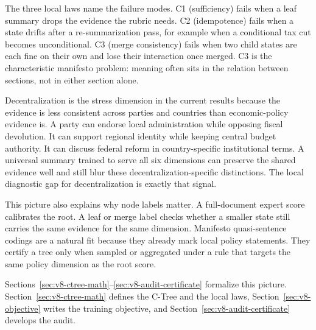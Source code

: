 The three local laws name the failure modes. C1 (sufficiency) fails
when a leaf summary drops the evidence the rubric needs. C2
(idempotence) fails when a state drifts after a re-summarization
pass, for example when a conditional tax cut becomes unconditional.
C3 (merge consistency) fails when two child states are each fine on
their own and lose their interaction once merged. C3 is the
characteristic manifesto problem: meaning often sits in the relation
between sections, not in either section alone.

Decentralization is the stress dimension in the current results
because the evidence is less consistent across parties and countries
than economic-policy evidence is. A party can endorse local
administration while opposing fiscal devolution. It can support
regional identity while keeping central budget authority. It can
discuss federal reform in country-specific institutional terms. A
universal summary trained to serve all six dimensions can preserve
the shared evidence well and still blur these
decentralization-specific distinctions. The local diagnostic gap
for decentralization is exactly that signal.

This picture also explains why node labels matter. A full-document
expert score calibrates the root. A leaf or merge label checks
whether a smaller state still carries the same evidence for the same
dimension. Manifesto quasi-sentence codings are a natural fit
because they already mark local policy statements. They certify a
tree only when sampled or aggregated under a rule that targets the
same policy dimension as the root score.

Sections~\ref{sec:v8-ctree-math}--\ref{sec:v8-audit-certificate}
formalize this picture. Section~\ref{sec:v8-ctree-math} defines the
C-Tree and the local laws,
Section~\ref{sec:v8-objective} writes the training objective, and
Section~\ref{sec:v8-audit-certificate} develops the audit.
